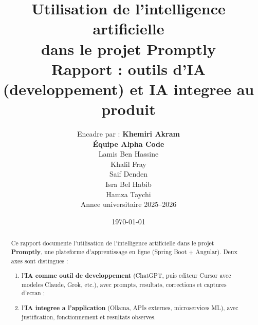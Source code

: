 \documentclass[11pt,a4paper]{report}
\title{%
  Utilisation de l'intelligence artificielle\\
  dans le projet \textbf{Promptly}\\[1em]
  \large Rapport : outils d'IA (developpement) et IA integree au produit
}
\author{%
  Encadre par : \textbf{Khemiri Akram}\\[1.2em]
  \textbf{\'Equipe Alpha Code}\\[0.8em]
  Lamis Ben Hassine\\
  Khalil Fray\\
  Saif Denden\\
  Isra Bel Habib\\
  Hamza Taychi\\[1em]
  Annee universitaire 2025--2026
}
\date{\today}
\begin{document}
\maketitle

\begin{abstract}
Ce rapport documente l'utilisation de l'intelligence artificielle dans le projet
\textbf{Promptly}, une plateforme d'apprentissage en ligne (Spring Boot + Angular).
Deux axes sont distingues :
\begin{enumerate}
  \item l'\textbf{IA comme outil de developpement} (ChatGPT, puis editeur Cursor
        avec modeles Claude, Grok, etc.), avec prompts, resultats, corrections
        et captures d'ecran ;
  \item l'\textbf{IA integree a l'application} (Ollama, APIs externes, microservices ML),
        avec justification, fonctionnement et resultats observes.
\end{enumerate}
\end{abstract}

\tableofcontents
\newpage






\end{document}
